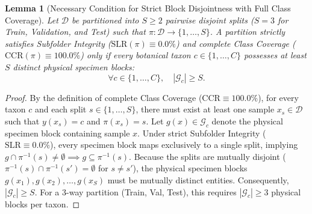 \documentclass[a4paper,fleqn]{cas-sc}
\newtheorem{lemma}{Lemma}
\begin{document}
\begin{lemma}[Necessary Condition for Strict Block Disjointness with Full Class Coverage]
\label{lem:block_condition}
Let $\mathcal{D}$ be partitioned into $S \ge 2$ pairwise disjoint splits ($S=3$ for Train, Validation, and Test) such that $\pi: \mathcal{D} \to \{1,\dots,S\}$. A partition strictly satisfies Subfolder Integrity ($\mathrm{SLR}(\pi) \equiv 0.0\%$) and complete Class Coverage ($\mathrm{CCR}(\pi) \equiv 100.0\%$) only if every botanical taxon $c \in \{1,\dots,C\}$ possesses at least $S$ distinct physical specimen blocks:
\begin{equation}
\forall c \in \{1,\dots,C\}, \quad |\mathcal{G}_c| \ge S.
\end{equation}
\end{lemma}
\begin{proof}
By the definition of complete Class Coverage ($\mathrm{CCR} \equiv 100.0\%$), for every taxon $c$ and each split $s \in \{1,\dots,S\}$, there must exist at least one sample $x_s \in \mathcal{D}$ such that $y(x_s) = c$ and $\pi(x_s) = s$. Let $g(x) \in \mathcal{G}_c$ denote the physical specimen block containing sample $x$. Under strict Subfolder Integrity ($\mathrm{SLR} \equiv 0.0\%$), every specimen block maps exclusively to a single split, implying $g \cap \pi^{-1}(s) \neq \emptyset \implies g \subseteq \pi^{-1}(s)$. Because the splits are mutually disjoint ($\pi^{-1}(s) \cap \pi^{-1}(s') = \emptyset$ for $s \neq s'$), the physical specimen blocks $g(x_1), g(x_2), \dots, g(x_S)$ must be mutually distinct entities. Consequently, $|\mathcal{G}_c| \ge S$. For a 3-way partition (Train, Val, Test), this requires $|\mathcal{G}_c| \ge 3$ physical blocks per taxon.
\end{proof}
\end{document}
